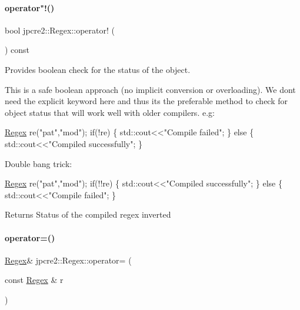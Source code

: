 \paragraph{\texorpdfstring{operator"!()}{operator!()}}
{\footnotesize\ttfamily bool jpcre2\+::\+Regex\+::operator! (\begin{DoxyParamCaption}{ }\end{DoxyParamCaption}) const\hspace{0.3cm}{\ttfamily [inline]}}



Provides boolean check for the status of the object. 

This is a safe boolean approach (no implicit conversion or overloading). We don\textquotesingle{}t need the explicit keyword here and thus it\textquotesingle{}s the preferable method to check for object status that will work well with older compilers. e.\+g\+:


\begin{DoxyCode}
\hyperlink{classjpcre2_1_1Regex_a302f65cd5747c5d34570ca76516ab715_a302f65cd5747c5d34570ca76516ab715}{Regex} re(\textcolor{stringliteral}{"pat"},\textcolor{stringliteral}{"mod"});
\textcolor{keywordflow}{if}(!re) \{
    std::cout<<\textcolor{stringliteral}{"Compile failed"};
\} \textcolor{keywordflow}{else} \{
    std::cout<<\textcolor{stringliteral}{"Compiled successfully"};
\}
\end{DoxyCode}
 Double bang trick\+:


\begin{DoxyCode}
\hyperlink{classjpcre2_1_1Regex_a302f65cd5747c5d34570ca76516ab715_a302f65cd5747c5d34570ca76516ab715}{Regex} re(\textcolor{stringliteral}{"pat"},\textcolor{stringliteral}{"mod"});
\textcolor{keywordflow}{if}(!!re) \{
    std::cout<<\textcolor{stringliteral}{"Compiled successfully"};
\} \textcolor{keywordflow}{else} \{
    std::cout<<\textcolor{stringliteral}{"Compile failed"};
\}
\end{DoxyCode}
 \begin{DoxyReturn}{Returns}
Status of the compiled regex inverted 
\end{DoxyReturn}
\hypertarget{classjpcre2_1_1Regex_ab43a14b4b6e75b7fa3221bc18a1d4121_ab43a14b4b6e75b7fa3221bc18a1d4121}{}\label{classjpcre2_1_1Regex_ab43a14b4b6e75b7fa3221bc18a1d4121_ab43a14b4b6e75b7fa3221bc18a1d4121} 
\paragraph{\texorpdfstring{operator=()}{operator=()}}
{\footnotesize\ttfamily \hyperlink{classjpcre2_1_1Regex}{Regex}\& jpcre2\+::\+Regex\+::operator= (\begin{DoxyParamCaption}\item[{const \hyperlink{classjpcre2_1_1Regex}{Regex} \&}]{r }\end{DoxyParamCaption})\hspace{0.3cm}{\ttfamily [inline]}}



